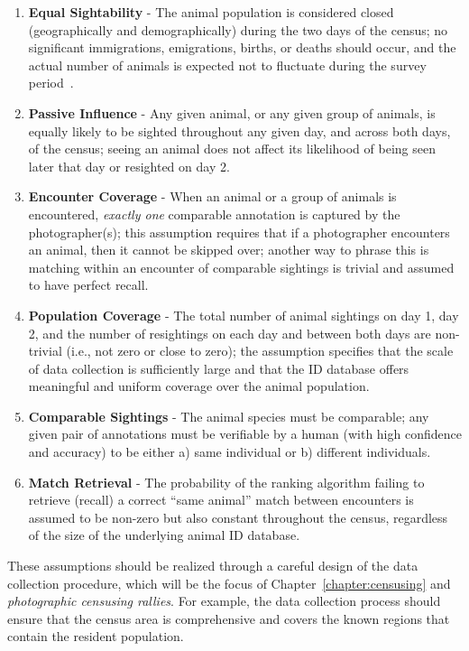 \begin{enumerate}
    \item \textbf{Equal Sightability} - The animal population is considered closed (geographically and demographically) during the two days of the census; no significant immigrations, emigrations, births, or deaths should occur, and the actual number of animals is expected not to fluctuate during the survey period~\cite{jolly_problem_1983}.
    \item \textbf{Passive Influence} - Any given animal, or any given group of animals, is equally likely to be sighted throughout any given day, and across both days, of the census; seeing an animal does not affect its likelihood of being seen later that day or resighted on day 2.
    \item \textbf{Encounter Coverage} - When an animal or a group of animals is encountered, {\it exactly one} comparable annotation is captured by the photographer(s); this assumption requires that if a photographer encounters an animal, then it cannot be skipped over; another way to phrase this is matching within an encounter of comparable sightings is trivial and assumed to have perfect recall.
    \item \textbf{Population Coverage} - The total number of animal sightings on day 1, day 2, and the number of resightings on each day and between both days are non-trivial (i.e., not zero or close to zero); the assumption specifies that the scale of data collection is sufficiently large and that the ID database offers meaningful and uniform coverage over the animal population.
    \item \textbf{Comparable Sightings} - The animal species must be comparable; any given pair of annotations must be verifiable by a human (with high confidence and accuracy) to be either a) same individual or b) different individuals.
    \item \textbf{Match Retrieval} - The probability of the ranking algorithm failing to retrieve (recall) a correct ``same animal'' match between encounters is assumed to be non-zero but also constant throughout the census, regardless of the size of the underlying animal ID database.
\end{enumerate}

\noindent These assumptions should be realized through a careful design of the data collection procedure, which will be the focus of Chapter~\ref{chapter:censusing} and \textit{photographic censusing rallies}.  For example, the data collection process should ensure that the census area is comprehensive and covers the known regions that contain the resident population.

